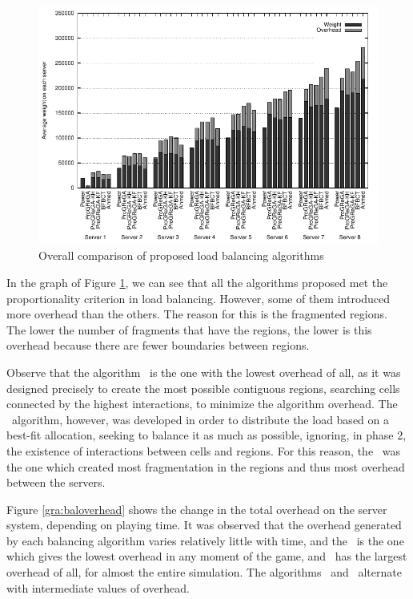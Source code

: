\begin{figure}[!t]
  \centering
  \includegraphics[width=1.0\linewidth]{images/baloverall_ah}
  \caption{Overall comparison of proposed load balancing algorithms}
  \label{gra:baloverall}
\end{figure}

In the graph of Figure \ref{gra:baloverall}, we can see that all the algorithms proposed met the proportionality criterion in load balancing. However, some of them introduced more overhead than the others. The reason for this is the fragmented regions. The lower the number of fragments that have the regions, the lower is this overhead because there are fewer boundaries between regions.

Observe that the algorithm \ggp\ is the one with the lowest overhead of all, as it was designed precisely to create the most possible contiguous regions, searching cells connected by the highest interactions, to minimize the algorithm overhead. The \bfa\ algorithm, however, was developed in order to distribute the load based on a best-fit allocation, seeking to balance it as much as possible, ignoring, in phase 2, the existence of interactions between cells and regions. For this reason, the \bfa\ was the one which created most fragmentation in the regions and thus most overhead between the servers.


Figure \ref{gra:baloverhead} shows the change in the total overhead on the server system, depending on playing time. It was observed that the overhead generated by each balancing algorithm varies relatively little with time, and the \ggp\ is the one which gives the lowest overhead in any moment of the game, and \bfa\ has the largest overhead of all, for almost the entire simulation. The algorithms \ggpk\ and \ggpf\ alternate with intermediate values of overhead.

